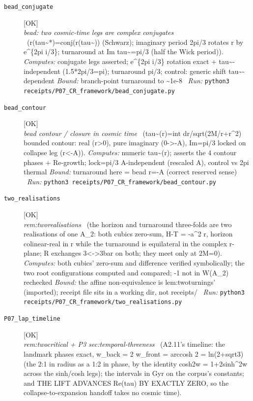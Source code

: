 \begin{description}
\item[\label{rcpt:bead_conjugate}\texttt{bead\_conjugate}]\hfill\textsf{[OK]}\\
\textit{bead: two cosmic-time legs are complex conjugates} \ (r(tau\textasciitilde{}*)=conj(r(tau\textasciitilde{})) (Schwarz); imaginary period 2pi/3 rotates r by e\textasciicircum{}\{2pi i/3\}; turnaround at Im tau\textasciitilde{}=pi/3 (half the Wick period)). 
\emph{Computes:} conjugate legs asserted; e\textasciicircum{}\{2pi i/3\} rotation exact + tau\textasciitilde{}-independent (1.5*2pi/3=pi); turnaround pi/3; control: generic shift tau\textasciitilde{}-dependent
 \emph{Bound:} branch-point turnaround to \textasciitilde{}1e-8
\ \emph{Run:} \texttt{python3 receipts/P07\_CR\_framework/bead\_conjugate.py}
\item[\label{rcpt:bead_contour}\texttt{bead\_contour}]\hfill\textsf{[OK]}\\
\textit{bead contour / closure in cosmic time} \ (tau\textasciitilde{}(r)=int dr/sqrt(2M/r+r\textasciicircum{}2) bounded contour: real (r>0), pure imaginary (0->-A), \textbar{}Im\textbar{}=pi/3 locked on collapse leg (r<-A)). 
\emph{Computes:} numeric tau\textasciitilde{}(r); asserts the 4 contour phases + Re-growth; lock=pi/3 A-independent (rescaled A), control vs 2pi thermal
 \emph{Bound:} turnaround here = bead r=-A (correct reserved sense)
\ \emph{Run:} \texttt{python3 receipts/P07\_CR\_framework/bead\_contour.py}
\item[\label{rcpt:two_realisations}\texttt{two\_realisations}]\hfill\textsf{[OK]}\\
\textit{rem:tworealisations} \ (the horizon and turnaround three-folds are two realisations of one A\_2: both cubics zero-sum, H-T = -a\textasciicircum{}2 r, horizon colinear-real in r while the turnaround is equilateral in the complex r-plane; R exchanges 3<->3bar on both; they meet only at 2M=0). 
\emph{Computes:} both cubics' zero-sum and difference verified symbolically; the two root configurations computed and compared; -1 not in W(A\_2) rechecked
 \emph{Bound:} the affine non-equivalence is lem:twoturnings' (imported); receipt file sits in a working dir, not receipts/
\ \emph{Run:} \texttt{python3 receipts/P07\_CR\_framework/two\_realisations.py}
\item[\label{rcpt:P07_lap_timeline}\texttt{P07\_lap\_timeline}]\hfill\textsf{[OK]}\\
\textit{rem:twocritical + P3 sec:temporal-threeness} \ (A2.11's timeline: the landmark phases exact, w\_back = 2 w\_front = arccosh 2 = ln(2+sqrt3) (the 2:1 in radius as a 1:2 in phase, by the identity cosh2w = 1+2sinh\textasciicircum{}2w across the sinh/cosh legs); the intervals in Gyr on the corpus's constants; and THE LIFT ADVANCES Re(tau) BY EXACTLY ZERO, so the collapse-to-expansion handoff takes no cosmic time). 

\end{description}
